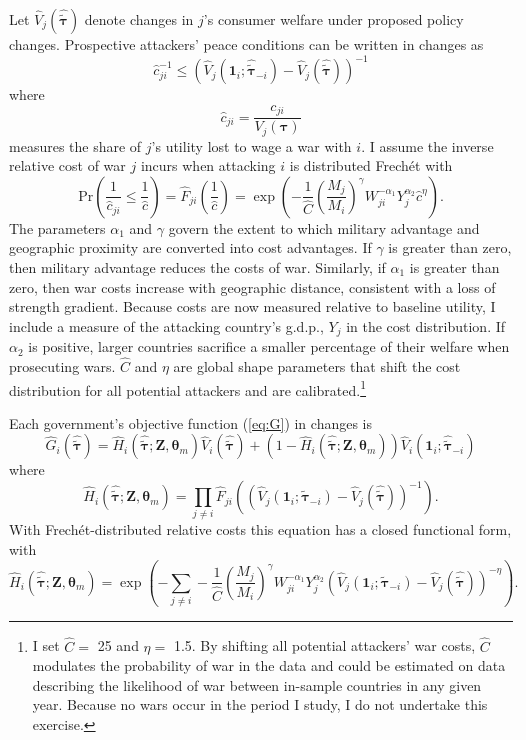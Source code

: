\documentclass{puthesis}
\begin{document}
Let \(\hat{V}_j(\hat{\tilde{\bm{\tau}}})\) denote changes in \(j\)'s
consumer welfare under proposed policy changes. Prospective attackers'
peace conditions can be written in changes as \[
\hat{c}_{ji}^{-1} \leq \left( \hat{V}_j \left( \bm{1}_i; \hat{\tilde{\bm{\tau}}}_{-i} \right) - \hat{V}_j \left( \hat{\tilde{\bm{\tau}}} \right) \right)^{-1}
\] where \[
\hat{c}_{ji} = \frac{c_{ji}}{V_j \left( \bm{\tau} \right)}
\] measures the share of \(j\)'s utility lost to wage a war with \(i\).
I assume the inverse relative cost of war \(j\) incurs when attacking
\(i\) is distributed Frechét with \begin{equation} \label{eq:inv_costs}
\text{Pr}\left( \frac{1}{\hat{c}_{ji}} \leq \frac{1}{\hat{c}} \right) = \hat{F}_{ji} \left( \frac{1}{\hat{c}} \right) = \exp \left( -\frac{1}{\hat{C}} \left( \frac{M_j}{M_i} \right)^{\gamma} W_{ji}^{-\alpha_1} Y_j^{\alpha_2} \hat{c}^{\eta} \right) .
\end{equation} The parameters \(\alpha_1\) and \(\gamma\) govern the
extent to which military advantage and geographic proximity are
converted into cost advantages. If \(\gamma\) is greater than zero, then
military advantage reduces the costs of war. Similarly, if \(\alpha_1\)
is greater than zero, then war costs increase with geographic distance,
consistent with a loss of strength gradient. Because costs are now
measured relative to baseline utility, I include a measure of the
attacking country's g.d.p., \(Y_j\) in the cost distribution. If
\(\alpha_2\) is positive, larger countries sacrifice a smaller
percentage of their welfare when prosecuting wars. \(\hat{C}\) and
\(\eta\) are global shape parameters that shift the cost distribution
for all potential attackers and are calibrated.\footnote{I set
  \(\hat{C}=\) 25 and \(\eta=\) 1.5. By shifting all potential
  attackers' war costs, \(\hat{C}\) modulates the probability of war in
  the data and could be estimated on data describing the likelihood of
  war between in-sample countries in any given year. Because no wars
  occur in the period I study, I do not undertake this exercise.}

Each government's objective function (\ref{eq:G}) in changes is
\begin{equation} \label{eq:Ghat}
\hat{G}_i(\hat{\tilde{\bm{\tau}}}) = \hat{H}_i(\hat{\tilde{\bm{\tau}}}; \bm{Z}, \bm{\theta}_m) \hat{V}_i(\hat{\tilde{\bm{\tau}}}) + \left( 1 - \hat{H}_i(\hat{\tilde{\bm{\tau}}}; \bm{Z}, \bm{\theta}_m) \right) \hat{V}_i(\bm{1}_i; \hat{\tilde{\bm{\tau}}}_{-i})
\end{equation} where \[
\hat{H}_i \left( \hat{\tilde{\bm{\tau}}}; \bm{Z}, \bm{\theta}_m \right) = \prod_{j \neq i} \hat{F}_{ji} \left( \left( \hat{V}_j \left( \bm{1}_i; \tilde{\bm{\tau}}_{-i} \right) - \hat{V}_j \left( \hat{\tilde{\bm{\tau}}} \right) \right)^{-1} \right) .
\] With Frechét-distributed relative costs this equation has a closed
functional form, with \[
\hat{H}_i \left( \hat{\tilde{\bm{\tau}}}; \bm{Z}, \bm{\theta}_m \right) = \exp \left( - \sum_{j \neq i} - \frac{1}{\hat{C}} \left( \frac{M_j}{M_i} \right)^{\gamma} W_{ji}^{-\alpha_1} Y_j^{\alpha_2} \left( \hat{V}_j \left( \bm{1}_i; \tilde{\bm{\tau}}_{-i} \right) - \hat{V}_j \left( \hat{\tilde{\bm{\tau}}} \right) \right)^{-\eta} \right) .
\]
\end{document}
